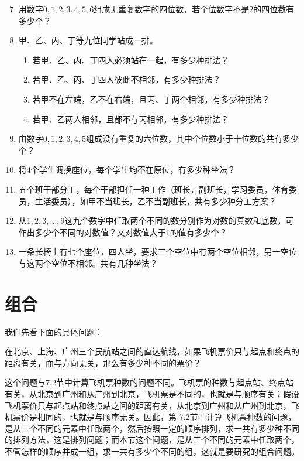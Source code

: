 \begin{enumerate}
 \setcounter{enumi}{6}   
 \item 用数字$0,1,2,3,4,5,6$组成无重复数字的四位数，若个位数字不是2的四位数有多少个？

 \item 甲、乙、丙、丁等九位同学站成一排。
\begin{enumerate}[(1)]
    \item 若甲、乙、丙、丁四人必须站在一起，有多少种排法？
     \item 若甲、乙、丙、丁四人彼此不相邻，有多少种排法？

 \item 若甲不在左端，乙不在右端，且丙、丁两个相邻，有多少种排法？
 \item 若甲、乙两人相邻，且都不与丙相邻，有多少种排法？
\end{enumerate}

 \item 由数字$0,1,2,3,4,5$组成没有重复的六位数，其中个位数小于十位数的共有多少个？

 \item 将4个学生调换座位，每个学生均不在原位，有多少种坐法？

 \item 五个班干部分工，每个干部担任一种工作（班长，副班长，学习委员，体育委员，生活委员），如甲不当班长，乙不当副班长，共有多少种分工方案？
 \item 从$1,2,3,\ldots,9$这九个数字中任取两个不同的数分别作为对数的真数和底数，可作出多少个不同的对数值？又对数值大于1的值有多少个？

 \item 一条长椅上有七个座位，四人坐，要求三个空位中有两个空位相邻，另一空位与这两个空位不相邻。共有几种坐法？

\end{enumerate}

\section{组合}
我们先看下面的具体问题：

在北京、上海、广州三个民航站之间的直达航线，如果飞机票价只与起点和终点的距离有关，而与方向无关，那么有多少种不同的票价？

这个问题与7.2节中计算飞机票种数的问题不同。飞机票的种数与起点站、终点站有关，从北京到广州和从广州到北京，飞机票是不同的，也就是与顺序有关；假设飞机票价只与起点站和终点站之间的距离有关，从北京到广州和从广州到北京，飞机票价是相同的，也就是与顺序无关。因此，第 7.2节中计算飞机票种数的问题，是从三个不同的元素中任取两个，然后按照一定的顺序排列，求一共有多少种不同的排列方法，这是排列问题；而本节这个问题，是从三个不同的元素中任取两个，不管怎样的顺序并成一组，求一共有多少个不同的组，这就是要研究的组合问题。

